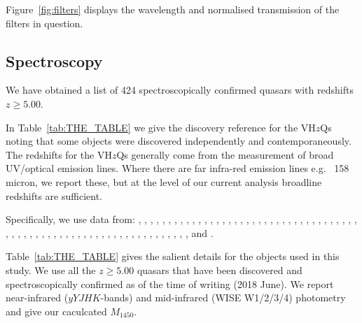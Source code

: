 \documentclass[usenatbib]{mnras}
\begin{document}
Figure~\ref{fig:filters} displays the wavelength and normalised transmission 
of the filters in question. 





\subsection{Spectroscopy} 
We have obtained a list of 424 spectroscopically confirmed 
quasars with redshifts $z\geq5.00$. 

In Table~\ref{tab:THE_TABLE}  we give the discovery reference for the
VH$z$Qs noting that some objects were discovered independently and
contemporaneously.  The redshifts for the VH$z$Qs generally come from
the measurement of broad UV/optical emission lines. Where 
there are far infra-red emission lines e.g. \cii~158 micron, we report 
these, but at the level of our current analysis broadline redshifts are
sufficient. 

Specifically, we use data from: \citet{Fan2000}, \citet{Fan2001c},
\citet{Fan2003}, \citet{Fan2004}, \citet{Mahabal2005},
\citet{Cool2006}, \citet{Fan2006}, \citet{Goto2006},
\citet{McGreer2006}, \citet{Carilli2007}, \citet{Kurk2007},
\citet{Stern2007}, \citet{Venemans2007}, \citet{Willott2007},
\citet{Jiang2008}, \citet{Wang2008}, \citet{Jiang2009}, \citet{Kurk2009}, 
\citet{Mortlock2009}, \citet{Willott2009}, \citet{Carilli2010}, 
\citet{Wang2010}, \citet{Willott2010a}, \citet{Willott2010b}, 
\citet{DeRosa2011}, \citet{Mortlock2011}, \citet{Wang2011}, 
\citet{Zeimann2011}, \citet{Morganson2012}, \citet{Venemans2012}, 
\citet{McGreer2013}, \citet{Venemans2013}, \citet{Wang2013}, 
\citet{Willott2013b}, \citet{Banados2014}, \citet{Calura2014}, 
\citet{Leipski2014}, \citet{Banados2015a}, \citet{Banados2015b}, 
\citet{Becker2015}, \citet{Carnall2015}, \citet{Jiang2015}, 
\citet{Kashikawa2015}, \citet{Kim2015}, \citet{Reed2015}, 
\citet{Venemans2015a}, \citet{Venemans2015b}, \citet{Willott2015}, 
\citet{Wu2015}, \citet{Venemans2016}, \citet{Wang2016_WISE}, 
\citet{Matsuoka2016}, \citet{WangR2016}, \citet{Mortlock2011},
\citet{McGreer2013}, \citet{Venemans2013}, \citet{Venemans2013},
\citet{Venemans2015a}, \citet{Venemans2015b}, \citet{Banados2016},
\citet{Matsuoka2016}, \citet{Reed2017}, \citet{Wang2017},
\citet{Mazzucchelli2017}, \citet{Ikeda2017}, \citet{Tang2017},
\citet{Koptelova2017}, \citet{Banados2018}, \citet{Matsuoka2018a} 
and \citet{Matsuoka2018b}. 

Table~\ref{tab:THE_TABLE} gives the salient details for the objects
used in this study. We use all the $z\geq5.00$ quasars that
have been discovered and spectroscopically confirmed as of the time of
writing (2018 June). We report near-infrared ($yYJHK$-bands)
and mid-infrared (WISE W1/2/3/4) photometry and give our caculcated 
$M_{1450}$. 
\end{document}

